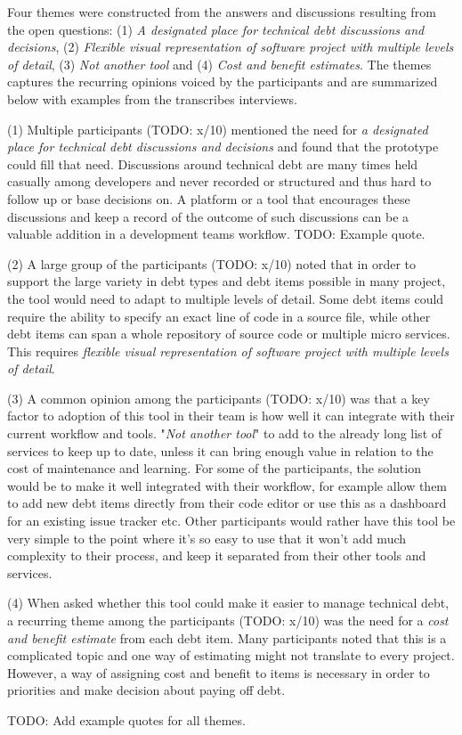 Four themes were constructed from the answers and discussions resulting from the open questions: (1) \textit{A designated place for technical debt discussions and decisions}, (2) \textit{Flexible visual representation of software project with multiple levels of detail}, (3) \textit{Not another tool} and (4) \textit{Cost and benefit estimates}.
The themes captures the recurring opinions voiced by the participants and are summarized below with examples from the transcribes interviews.

(1) Multiple participants (TODO: x/10) mentioned the need for \textit{a designated place for technical debt discussions and decisions} and found that the prototype could fill that need.
Discussions around technical debt are many times held casually among developers and never recorded or structured and thus hard to follow up or base decisions on.
A platform or a tool that encourages these discussions and keep a record of the outcome of such discussions can be a valuable addition in a development teams workflow. 
TODO: Example quote.

(2) A large group of the participants (TODO: x/10) noted that in order to support the large variety in debt types and debt items possible in many project, the tool would need to adapt to multiple levels of detail.
Some debt items could require the ability to specify an exact line of code in a source file, while other debt items can span a whole repository of source code or multiple micro services.
This requires \textit{flexible visual representation of software project with multiple levels of detail}.

(3) A common opinion among the participants (TODO: x/10) was that a key factor to adoption of this tool in their team is how well it can integrate with their current workflow and tools.
"\textit{Not another tool}" to add to the already long list of services to keep up to date, unless it can bring enough value in relation to the cost of maintenance and learning.
For some of the participants, the solution would be to make it well integrated with their workflow, for example allow them to add new debt items directly from their code editor or use this as a dashboard for an existing issue tracker etc.
Other participants would rather have this tool be very simple to the point where it's so easy to use that it won't add much complexity to their process, and keep it separated from their other tools and services.

(4) When asked whether this tool could make it easier to manage technical debt, a recurring theme among the participants (TODO: x/10) was the need for a \textit{cost and benefit estimate} from each debt item.
Many participants noted that this is a complicated topic and one way of estimating might not translate to every project.
However, a way of assigning cost and benefit to items is necessary in order to priorities and make decision about paying off debt.

TODO: Add example quotes for all themes.